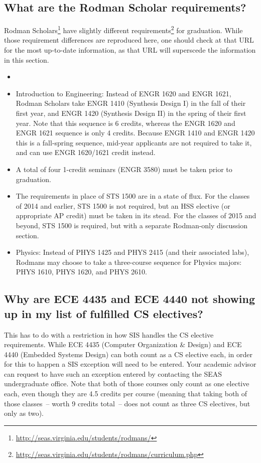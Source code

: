 \documentclass[10pt,letter]{book}
\newenvironment{itemlist}{
\begin{itemize}
\setlength{\itemsep}{0pt}
\setlength{\parskip}{0pt}}
{\end{itemize}}
\newcommand{\myurl}[1]{\footnote{\scriptsize\url{#1}}}
\begin{document}
\subsection{What are the Rodman Scholar requirements?}

Rodman Scholars\myurl{http://seas.virginia.edu/students/rodmans/} have
slightly different
requirements\myurl{http://seas.virginia.edu/students/rodmans/curriculum.php}
for graduation.  While those requirement differences are reproduced
here, one should check at that URL for the most up-to-date
information, as that URL will superscede the information in this
section.

\begin{itemlist}
\item 
\item Introduction to Engineering: Instead of ENGR 1620 and ENGR 1621,
  Rodman Scholars take ENGR 1410 (Synthesis Design I) in the fall of
  their first year, and ENGR 1420 (Synthesis Design II) in the spring
  of their first year.  Note that this sequence is 6 credits, whereas
  the ENGR 1620 and ENGR 1621 sequence is only 4 credits.  Because
  ENGR 1410 and ENGR 1420 this is a fall-spring sequence, mid-year
  applicants are not required to take it, and can use ENGR 1620/1621
  credit instead.
\item A total of four 1-credit seminars (ENGR 3580) must be taken
  prior to graduation.
\item The requirements in place of STS 1500 are in a state of flux.
  For the classes of 2014 and earlier, STS 1500 is not required, but
  an HSS elective (or appropriate AP credit) must be taken in its
  stead.  For the classes of 2015 and beyond, STS 1500 is required,
  but with a separate Rodman-only discussion section.
\item Physics: Instead of PHYS 1425 and PHYS 2415 (and their
  associated labs), Rodmans may choose
  to take a three-course sequence for Physics majors: PHYS 1610, PHYS
  1620, and PHYS 2610.
\end{itemlist}

\subsection{Why are ECE 4435 and ECE 4440 not showing up in my list of
  fulfilled CS electives?}
\label{sec:sisece4435issue}

This has to do with a restriction in how SIS handles the CS elective
requirements.  While ECE 4435 (Computer Organization \& Design) and
ECE 4440 (Embedded Systems Design) can both count as a CS elective
each, in order for this to happen a SIS exception will need to be
entered.  Your academic advisor can request to have such an exception
entered by contacting the SEAS undergraduate office.  Note that both
of those courses only count as one elective each, even though they are
4.5 credits per course (meaning that taking both of those classes~--
worth 9 credits total~-- does not count as three CS electives, but
only as two).
\end{document}
